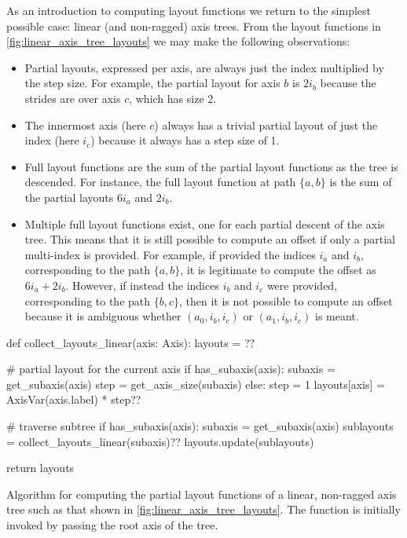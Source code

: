 \documentclass[thesis]{subfiles}
\begin{document}
As an introduction to computing layout functions we return to the simplest possible case: linear (and non-ragged) axis trees.
From the layout functions in \cref{fig:linear_axis_tree_layouts} we may make the following observations:
\begin{itemize}
  \item
    Partial layouts, expressed per axis, are always just the index multiplied by the step size.
    For example, the partial layout for axis $b$ is $2 i_b$ because the strides are over axis $c$, which has size 2.
  \item
    The innermost axis (here $c$) always has a trivial partial layout of just the index (here $i_c$) because it always has a step size of 1.
  \item
    Full layout functions are the sum of the partial layout functions as the tree is descended.
    For instance, the full layout function at path $\{a,b\}$ is the sum of the partial layouts $6 i_a$ and $2 i_b$.

  \item
    Multiple full layout functions exist, one for each partial descent of the axis tree.
    This means that it is still possible to compute an offset if only a partial multi-index is provided.
    For example, if provided the indices $i_a$ and $i_b$, corresponding to the path $\{a,b\}$, it is legitimate to compute the offset as $6i_a+2i_b$.
    However, if instead the indices $i_b$ and $i_c$ were provided, corresponding to the path $\{b,c\}$, then it is not possible to compute an offset because it is ambiguous whether $(a_0, i_b, i_c)$ or $(a_1, i_b, i_c)$ is meant.
\end{itemize}

\begin{algorithm}
  \begin{center}
    \begin{minipage}{.9\textwidth}
      \begin{pyalg2}
        def collect_layouts_linear(axis: Axis):
          layouts = {}?\label{code:layouts_dict_init}?

          # partial layout for the current axis
          if has_subaxis(axis):
            subaxis = get_subaxis(axis)
            step = get_axis_size(subaxis)
          else:
            step = 1
          layouts[axis] = AxisVar(axis.label) * step?\label{code:linear_layout}?

          # traverse subtree
          if has_subaxis(axis): 
            subaxis = get_subaxis(axis)
            sublayouts = collect_layouts_linear(subaxis)?\label{code:linear_sublayouts}?
            layouts.update(sublayouts)

          return layouts
      \end{pyalg2}
    \end{minipage}
  \end{center}

  \caption{
    Algorithm for computing the partial layout functions of a linear, non-ragged axis tree such as that shown in \cref{fig:linear_axis_tree_layouts}.
    The function is initially invoked by passing the root axis of the tree.
  }
  \label{alg:collect_layouts_linear}
\end{algorithm}
\end{document}
